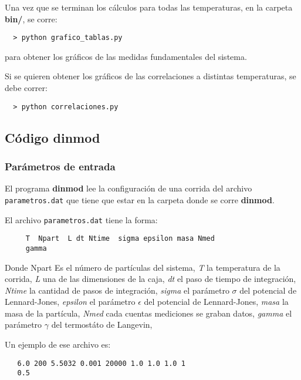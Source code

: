 Una vez que se terminan los cálculos para todas las temperaturas,  en 
la carpeta \textbf{bin/}, se corre:

\begin{verbatim}
  > python grafico_tablas.py 
\end{verbatim}

para obtener los gráficos de las medidas fundamentales del sistema.

Si se quieren obtener los gráficos de las correlaciones a distintas temperaturas, 
se debe correr:

\begin{verbatim}
  > python correlaciones.py 
\end{verbatim}



\subsection{C\'odigo dinmod}

\subsubsection{Par\'ametros de entrada}

El programa \textbf{\textbf{dinmod}} lee la configuraci\'on de una corrida del 
archivo \texttt{parametros.dat} que tiene que estar en la carpeta donde se
corre \textbf{\textbf{dinmod}}.

El archivo \texttt{parametros.dat} tiene la forma: 

\begin{verbatim}
     T  Npart  L dt Ntime  sigma epsilon masa Nmed
     gamma
\end{verbatim}

Donde Npart
Es el número de partículas del sistema, \textit{T} la temperatura de la corrida,
\textit{L} una de las dimensiones de la caja, \textit{dt} el paso de tiempo de integración,
\textit{Ntime} la cantidad de pasos de integración,
\textit{sigma} el parámetro $\sigma$ del potencial de Lennard-Jones,
\textit{epsilon} el parámetro $\epsilon$ del potencial de Lennard-Jones,
\textit{masa} la masa de la partícula,
\textit{Nmed} cada cuentas mediciones se graban datos,
\textit{gamma} el parámetro $\gamma$ del termostáto de Langevin,



Un ejemplo de ese archivo es:

\begin{verbatim}
   6.0 200 5.5032 0.001 20000 1.0 1.0 1.0 1
   0.5
\end{verbatim}



